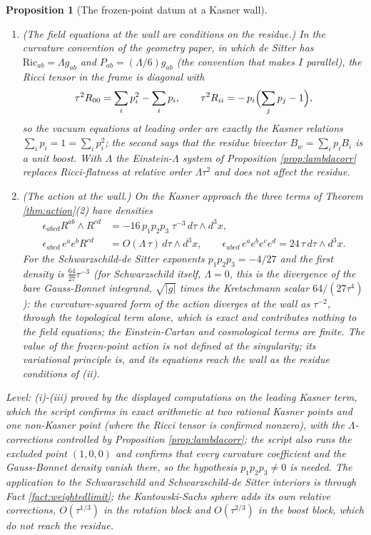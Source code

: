 \documentclass[11pt]{article}
\newtheorem{proposition}[theorem]{Proposition}
\theoremstyle{definition}
\begin{document}
\begin{proposition}[The frozen-point datum at a Kasner wall]
\begin{enumerate}
\item[(ii)] \emph{(The field equations at the wall are conditions on the residue.)} In the curvature convention of the geometry paper, in which de Sitter has $\mathrm{Ric}_{ab} = \Lambda g_{ab}$ and $P_{ab} = (\Lambda/6)g_{ab}$ (the convention that makes $I$ parallel), the Ricci tensor in the frame is diagonal with
\[
\tau^2 R_{00} = \sum_i p_i^2 - \sum_i p_i, \qquad \tau^2 R_{ii} = -\,p_i\Bigl(\sum_j p_j - 1\Bigr) ,
\]
so the vacuum equations at leading order are exactly the Kasner relations $\sum_i p_i = 1 = \sum_i p_i^2$; the second says that the residue bivector $B_w = \sum_i p_i B_i$ is a unit boost. With $\Lambda$ the Einstein-$\Lambda$ system of Proposition \ref{prop:lambdacorr} replaces Ricci-flatness at relative order $\Lambda\tau^2$ and does not affect the residue.
\item[(iii)] \emph{(The action at the wall.)} On the Kasner approach the three terms of Theorem \ref{thm:action}(2) have densities
\[
\begin{aligned}
\epsilon_{abcd}R^{ab}\wedge R^{cd} &= -16\,p_1p_2p_3\;\tau^{-3}\, d\tau\wedge d^3x, \\
\epsilon_{abcd}\,e^a e^b R^{cd} &= O(\Lambda\,\tau)\, d\tau\wedge d^3x, \qquad
\epsilon_{abcd}\,e^ae^be^ce^d = 24\,\tau\, d\tau\wedge d^3x .
\end{aligned}
\]
For the Schwarzschild-de Sitter exponents $p_1p_2p_3 = -4/27$ and the first density is $\tfrac{64}{27}\tau^{-3}$ (for Schwarzschild itself, $\Lambda = 0$, this is the divergence of the bare Gauss-Bonnet integrand, $\sqrt{|g|}$ times the Kretschmann scalar $64/(27\tau^4)$): the curvature-squared form of the action diverges at the wall as $\tau^{-2}$, through the topological term alone, which is exact and contributes nothing to the field equations; the Einstein-Cartan and cosmological terms are finite. The value of the frozen-point action is not defined at the singularity; its variational principle is, and its equations reach the wall as the residue conditions of (ii).
\end{enumerate}
\emph{Level:} (i)-(iii) proved by the displayed computations on the leading Kasner term, which the script confirms in exact arithmetic at two rational Kasner points and one non-Kasner point (where the Ricci tensor is confirmed nonzero), with the $\Lambda$-corrections controlled by Proposition \ref{prop:lambdacorr}; the script also runs the excluded point $(1,0,0)$ and confirms that every curvature coefficient and the Gauss-Bonnet density vanish there, so the hypothesis $p_1p_2p_3 \neq 0$ is needed. The application to the Schwarzschild and Schwarzschild-de Sitter interiors is through Fact \ref{fact:weightedlimit}; the Kantowski-Sachs sphere adds its own relative corrections, $O(\tau^{1/3})$ in the rotation block and $O(\tau^{2/3})$ in the boost block, which do not reach the residue.
\end{proposition}
\end{document}
